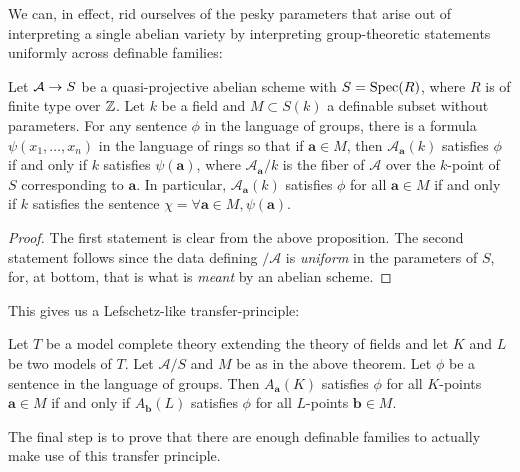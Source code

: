 We can, in effect, rid ourselves of the pesky parameters that arise out of interpreting a single abelian variety by interpreting group-theoretic statements uniformly across definable families:

\begin{theorem}
Let $\mathcal{A}\rightarrow S$ be a quasi-projective abelian scheme with $S=\operatorname{Spec}(R)$, where $R$ is of finite type over $\mathbb{Z}$. Let $k$ be a field and $M\subset S(k)$ a definable subset without parameters. For any sentence $\phi$ in the language of groups, there is a formula $\psi(x_1,\dots, x_n)$ in the language of rings so that if $\mathbf{a}\in M$, then $\mathcal{A}_{\mathbf{a}}(k)$ satisfies $\phi$ if and only if $k$ satisfies $\psi(\mathbf{a})$, where $\mathcal{A}_{\mathbf{a}}/k$ is the fiber of $\mathcal{A}$ over the $k$-point of $S$ corresponding to $\mathbf{a}$. In particular, $\mathcal{A}_{\mathbf{a}}(k)$ satisfies $\phi$ for all $\mathbf{a}\in M$ if and only if $k$ satisfies the sentence $\chi = \forall \mathbf{a}\in M, \psi(\mathbf{a})$.
\end{theorem}
\begin{proof}
The first statement is clear from the above proposition. The second statement follows since the data defining $/\mathcal{A}$ is \emph{uniform} in the parameters of $S$, for, at bottom, that is what is \emph{meant} by an abelian scheme.
\end{proof}

This gives us a Lefschetz-like transfer-principle:

\begin{theorem}
\label{transfer-theorem}
Let $T$ be a model complete theory extending the theory of fields and let $K$ and $L$ be two models of $T$. Let $\mathcal{A}/S$ and $M$ be as in the above theorem. Let $\phi$ be a sentence in the language of groups. Then $A_{\mathbf{a}}(K)$ satisfies $\phi$ for all $K$-points $\mathbf{a}\in M$ if and only if $A_{\mathbf{b}}(L)$ satisfies $\phi$ for all $L$-points $\mathbf{b}\in M$.
\end{theorem}

The final step is to prove that there are enough definable families to actually make use of this transfer principle.

